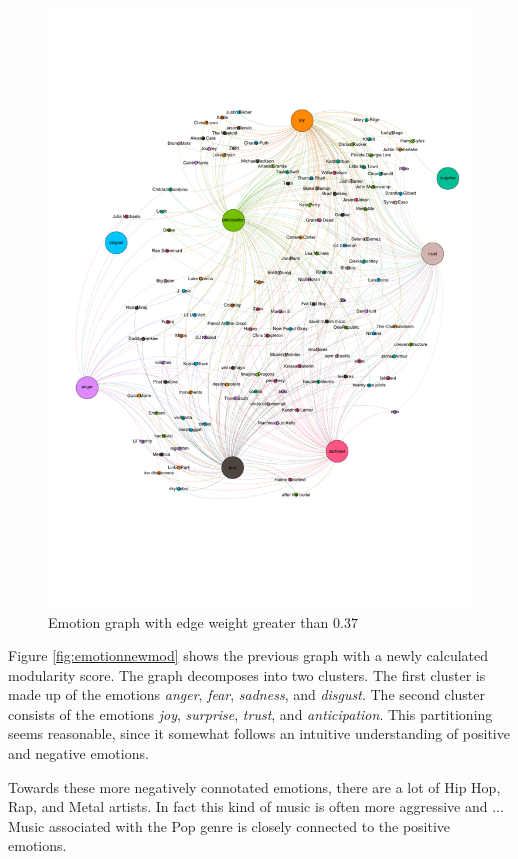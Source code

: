 \documentclass[10pt,a4paper]{article}
\begin{document}
		\begin{figure}[htb]
			\centering
			\includegraphics[trim=0mm 50mm 0mm 50mm, clip, width=\linewidth]{data/emotion_graph}
			\caption{Emotion graph with edge weight greater than $0.37$}
			\label{fig:emotiongraph}
		\end{figure}
		
		Figure \ref{fig:emotionnewmod} shows the previous graph with a newly calculated modularity score. The graph decomposes into two clusters. The first cluster is made up of the emotions \textit{anger}, \textit{fear}, \textit{sadness}, and \textit{disgust}. The second cluster consists of the emotions \textit{joy}, \textit{surprise}, \textit{trust}, and \textit{anticipation}. This partitioning seems reasonable, since it somewhat follows an intuitive understanding of positive and negative emotions.
		
		Towards these more negatively connotated emotions, there are a lot of Hip Hop, Rap, and Metal artists. In fact this kind of music is often more aggressive and ...
		Music associated with the Pop genre is closely connected to the positive emotions.
		
\end{document}
